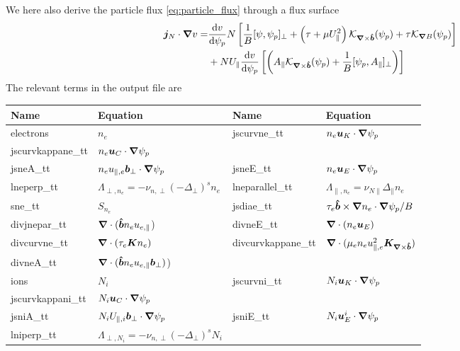 We here also derive the particle flux \eqref{eq:particle_flux} through a flux surface
\begin{align} \label{eq:radial_particle_flux}
 \vec j_{N}\cn v %
 =&
  \frac{\d v}{\d \psi_p} N\left[\frac{1}{B}[\psi, \psi_p]_\perp + \left(\tau + \mu U_\parallel^2\right)
   \mathcal K_{\vn\times\bhat}(\psi_p) + \tau  \mathcal K_{\vn B}(\psi_p) \right] \nonumber\\
 &+ NU_\parallel\frac{\d v}{\d \psi_p}\left [\left( A_\parallel \mathcal
 K_{\vn\times\bhat}(\psi_p) + \frac{1}{B}[\psi_p, A_\parallel]_\perp\right) \right]
\end{align}
The relevant terms in the output file are
\begin{longtable}{llll}
\toprule
\rowcolor{gray!50}\textbf{Name} &  \textbf{Equation} & \textbf{Name} &  \textbf{Equation}\\
\midrule
    electrons & $n_e$ &
    jscurvne\_tt &$ n_e  {\boldsymbol{u}}_K \cdot{\boldsymbol{\nabla}} \psi_p$ \\
    jscurvkappane\_tt &$ n_e  {\boldsymbol{u}}_C \cdot{\boldsymbol{\nabla}} \psi_p$ &
    & \\
    jsneA\_tt &$ n_e u_{\parallel,e} {\boldsymbol{ b}}_\perp  \cdot{\boldsymbol{\nabla}} \psi_p$ &
    jsneE\_tt & $ n_e {\boldsymbol{u}}_E\cdot{\boldsymbol{\nabla}}\psi_p$ \\
    lneperp\_tt &$ \Lambda_{\perp,n_e} = -\nu_{n,\perp} (-\Delta_\perp)^s n_e$&
    lneparallel\_tt &$ \Lambda_{\parallel,n_e} = \nu_{N\parallel} \Delta_\parallel n_e$ \\
    sne\_tt & $S_{n_e}$ &
    jsdiae\_tt & $\tau_e \bm{\hat{b}} \times {\boldsymbol{\nabla}} n_e \cdot{\boldsymbol{\nabla}} \psi_p /B$\\
    divjnepar\_tt & ${\boldsymbol{\nabla}}\cdot (\bm{\hat{b}} n_e u_{e,\parallel}$) &
    divneE\_tt & ${\boldsymbol{\nabla}}\cdot ( n_e {\boldsymbol{u}}_E)$ \\
    divcurvne\_tt & ${\boldsymbol{\nabla}}\cdot( \tau_e {\boldsymbol{K}} n_e)$ &
    divcurvkappane\_tt & ${\boldsymbol{\nabla}}\cdot( \mu_e n_e u_{\parallel,e}^2 {{\boldsymbol{K}}_{{\boldsymbol{\nabla}}\times\bm{\hat{b}}}})$ \\
    divneA\_tt & ${\boldsymbol{\nabla}}\cdot (\bm{\hat{b}} n_e u_{e,\parallel} {{\boldsymbol{b}}}_\perp)$) &
     &  \\
    ions & $N_i$ &
    jscurvni\_tt &$ N_i {\boldsymbol{u}}_K \cdot{\boldsymbol{\nabla}} \psi_p$ \\
    jscurvkappani\_tt &$ N_i {\boldsymbol{u}}_C \cdot{\boldsymbol{\nabla}} \psi_p$ &
    & \\
    jsniA\_tt &$ N_i U_{\parallel,i} {\boldsymbol{ b}}_\perp  \cdot{\boldsymbol{\nabla}} \psi_p$ &
    jsniE\_tt & $ N_i {\boldsymbol{u}}^i_E\cdot{\boldsymbol{\nabla}}\psi_p$ \\
    lniperp\_tt &$ \Lambda_{\perp,N_i} = -\nu_{n,\perp} (-\Delta_\perp)^s N_i$&

\end{longtable}
